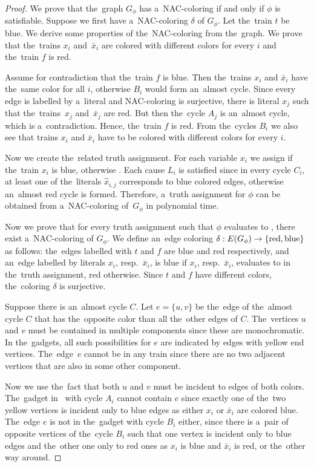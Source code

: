 \begin{proof}
	We prove that the~graph $G_\phi$ has a~NAC-coloring if and only if
	$\phi$ is satisfiable.
	Suppose we first have a~NAC-coloring $\delta$ of $G_\phi$.
	Let the~train $t$ be blue.
	We derive some properties of the~NAC-coloring from the~graph.
	We prove that the~trains $x_i$ and~$\bar{x}_i$
	are colored with different colors for every $i$
	and the~train $f$ is red.

	Assume for contradiction that the~train $f$ is blue.
	Then the~trains $x_i$ and $\bar{x}_i$ have the~same color for all $i$,
	otherwise $B_i$ would form an~almost cycle.
	Since every edge is labelled by a~literal and NAC-coloring is surjective,
	there is literal $x_j$ such that the~trains~$x_j$ and~$\bar{x}_j$ are red.
	But then the~cycle $A_j$ is an~almost cycle, which is a~contradiction.
	Hence, the~train $f$ is red.
	From the~cycles $B_i$ we also see
	that trains $x_i$ and $\bar{x}_i$ have to be colored with different colors
	for every $i$.

	Now we create the~related truth assignment.
	For each variable $x_i$ we assign \true{} if
	the~train $x_i$ is blue,
	otherwise \false{}.
	Each cause $L_i$ is satisfied since
	in every cycle $C_i$, at least one of
	the~literals $\hat{x}_{i,j}$ corresponds to blue colored
	edges, otherwise an~almost red cycle is formed.
	Therefore, a~truth assignment for $\phi$ can be obtained
	from a~NAC-coloring of~$G_\phi$ in polynomial time.

	Now we prove that for every truth assignment such that $\phi$ evaluates to \true{}, there exist
	a~NAC-coloring of $G_\phi$. We define an~edge coloring
	$\delta: E(G_\phi) \to \{\text{red}, \text{blue}\}$ as follows:
	the~edges labelled with $t$ and $f$ are blue and red respectively,
	and an~edge labelled by literals $x_i$, resp.\ $\bar{x}_i$, is blue
	if $x_i$, resp.\ $\bar{x}_i$, evaluates to \true{} in the~truth assignment, red otherwise.
	Since $t$ and $f$ have different colors,
	the~coloring $\delta$ is surjective.

	Suppose there is an~almost cycle $C$.
	Let $e=\{u, v\}$ be the~edge of the~almost cycle $C$ that has the~opposite color
	than all the~other edges of $C$.
	The~vertices $u$ and $v$ must be contained in multiple \trcon{} components
	since these are monochromatic.
	In the~gadgets, all such possibilities for $e$ are indicated by edges with yellow end vertices.
	The~edge~$e$ cannot be in any train since there are no two adjacent vertices that are also
	in some other \trcon{} component.

	Now we use the~fact that both $u$ and $v$ must be incident to edges of both colors.
	The~gadget in~ with cycle $A_i$
	cannot contain $e$ since exactly one of the~two yellow vertices is incident only to blue edges
	as either $x_i$ or $\bar{x}_i$ are colored blue.
	The~edge $e$ is not in the~gadget with cycle $B_i$ either,
	since there is a~pair of opposite vertices of the~cycle $B_i$
	such that one vertex is incident only to blue edges and the~other one only to red ones
	as $x_i$ is blue and $\bar{x}_i$ is red, or the~other way around.


\end{proof}
